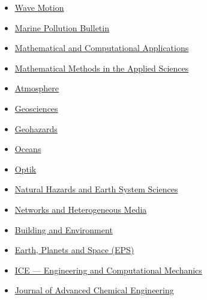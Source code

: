 \documentclass[final, a4paper, oneside, 12pt]{article}
\numberwithin{equation}{section}
\begin{document}
\begin{itemize}
    \item \href{http://www.elsevier.com/locate/wavemoti}%
    {Wave Motion}

    \item \href{https://www.sciencedirect.com/journal/marine-pollution-bulletin/}{Marine Pollution Bulletin}
    
    \item \href{https://www.mdpi.com/journal/mca}{Mathematical and Computational Applications}
    
    \item \href{https://onlinelibrary.wiley.com/journal/10991476/}{Mathematical Methods in the Applied Sciences}

    \item \href{https://www.mdpi.com/journal/atmosphere/}{Atmosphere}
    
    \item \href{https://www.mdpi.com/journal/geosciences/}{Geosciences}

    \item \href{https://www.mdpi.com/journal/geohazards/}{Geohazards}

    \item \href{https://www.mdpi.com/journal/oceans/}{Oceans}
    
    \item \href{https://www.sciencedirect.com/journal/optik/}{Optik}
    
    \item \href{http://www.nat-hazards-earth-syst-sci.net/}%
    {Natural Hazards and Earth System Sciences}

    \item \href{https://www.aimspress.com/journal/nhm/}{Networks and Heterogeneous Media}

    \item \href{https://www.sciencedirect.com/journal/building-and-environment}%
    {Building and Environment}
    
    \item \href{http://www.terrapub.co.jp/journals/EPS/}{Earth, Planets and Space (EPS)}
    
    \item \href{http://www.icevirtuallibrary.com/content/serial/eacm/}{ICE --- Engineering and Computational Mechanics}
    
    \item \href{http://www.ashdin.com/journals/jace/jace.aspx}{Journal of Advanced Chemical Engineering}
    

\end{itemize}
\end{document}
